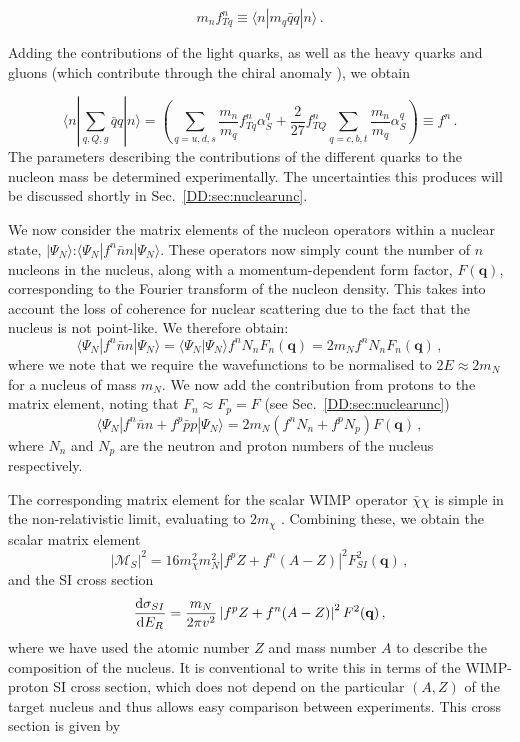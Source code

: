 \begin{equation}
m_n f_{Tq}^n \equiv \langle n|m_q\bar{q}q|n \rangle \,.
\end{equation}

Adding the contributions of the light quarks, as well as the heavy quarks and gluons (which contribute through the chiral anomaly \cite{Shifman:1978}), we obtain

\begin{equation}
\langle n| \sum_{q,Q,g} \bar{q} q |n \rangle  = \left(\sum_{q=u,d,s}\frac{m_n}{m_q} f_{Tq}^n \alpha_S^q + \frac{2}{27} f_{TQ}^n \sum_{q = c,b,t} \frac{m_n}{m_q} \alpha_S^q\right) \equiv f^n\,.
\end{equation}
The parameters describing the contributions of the different quarks to the nucleon mass be determined experimentally. The uncertainties this produces will be discussed shortly in Sec.~\ref{DD:sec:nuclearunc}.

We now consider the matrix elements of the nucleon operators within a nuclear state, $|\Psi_N\rangle$:$\langle \Psi_N|f^n \bar{n}n|\Psi_N\rangle$. These operators now simply count the number of \(n\) nucleons in the nucleus, along with a momentum-dependent form factor, $F(\textbf{q})$, corresponding to the Fourier transform of the nucleon density. This takes into account the loss of coherence for nuclear scattering due to the fact that the nucleus is not point-like. We therefore obtain:
\begin{equation}
\langle \Psi_N|f^n \bar{n}n|\Psi_N\rangle = \langle \Psi_N|\Psi_N\rangle f^n N_n F_n(\textbf{q}) = 2m_N f^n N_n F_n(\textbf{q})\,,
\end{equation}
where we note that we require the wavefunctions to be normalised to \(2E \approx 2m_N\) for a nucleus of mass \(m_N\). We now add the contribution from protons to the matrix element, noting that \(F_n \approx F_p = F\) (see Sec.~\ref{DD:sec:nuclearunc})
\begin{equation}
\langle \Psi_N|f^n \bar{n}n + f^p \bar{p}p|\Psi_N\rangle = 2m_N (f^n N_n + f^p N_p) F(\textbf{q})\,,
\end{equation}
where $N_n$ and $N_p$ are the neutron and proton numbers of the nucleus respectively.

The corresponding matrix element for the scalar WIMP operator $\bar{\chi}\chi$ is simple in the non-relativistic limit, evaluating to $2 m_\chi$ \cite{}. Combining these, we obtain the scalar matrix element
\begin{equation}
|\mathcal{M}_S|^2 = 16 m_\chi^2 m_N^2 \left|f^p Z + f^n (A-Z)\right|^2 F_{SI}^2(\textbf{q})\,,
\end{equation}
and the SI cross section
\begin{equation}
\frac{\mathrm{d}\sigma_{SI}}{\mathrm{d}E_R} = \frac{m_N}{ 2 \pi v^2} \left|f^p Z + f^n (A-Z)\right|^2 F^2(\textbf{q})\,,
\end{equation}
where we have used the atomic number $Z$ and mass number $A$ to describe the composition of the nucleus. It is conventional to write this in terms of the  WIMP-proton SI cross section, which does not depend on the particular $(A,Z)$ of the target nucleus and thus allows easy comparison between experiments. This cross section is given by

